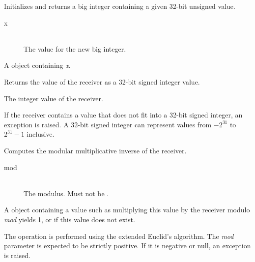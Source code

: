 
Initializes and returns a big integer containing a given 32-bit unsigned value.


\docparams

\begin{description}
\item[x] \hfill \\ The value for the new big integer.
\end{description}

\docretval

A  object containing \emph{x}.



Returns the value of the receiver as a 32-bit signed integer value.


\docretval

The integer value of the receiver.

\docdiscuss

If the receiver contains a value that does not fit into a 32-bit signed integer, an exception is raised. A 32-bit signed integer can represent values from $-2^{31}$ to $2^{31}-1$ inclusive.



Computes the modular multiplicative inverse of the receiver.


\docparams

\begin{description}
\item[mod] \hfill \\ The modulus. Must not be .
\end{description}

\docretval

A  object containing a value such as multiplying this value by the receiver modulo \emph{mod} yields 1, or  if this value does not exist.

\docdiscuss

The operation is performed using the extended Euclid's algorithm. The \emph{mod} parameter is expected to be strictly positive. If it is negative or null, an exception is raised.

